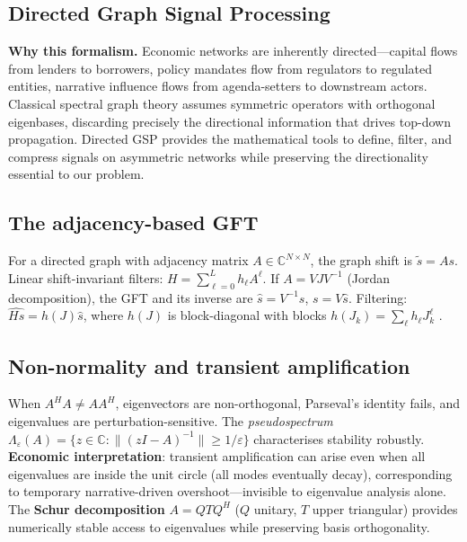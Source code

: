 \documentclass[11pt,a4paper]{article}
\theoremstyle{definition}
\newcommand{\C}{\mathbb{C}}
\begin{document}
\newpage
\begin{appendices}
\renewcommand{\thesection}{\Alph{section}}
\titleformat{\section}{\Large\bfseries\color{accent}}{Appendix~\thesection}{1em}{}

\section{Directed Graph Signal Processing}
\label{app:directed_gsp}

\textbf{Why this formalism.} Economic networks are inherently directed---capital flows from lenders to borrowers, policy mandates flow from regulators to regulated entities, narrative influence flows from agenda-setters to downstream actors. Classical spectral graph theory assumes symmetric operators with orthogonal eigenbases, discarding precisely the directional information that drives top-down propagation. Directed GSP provides the mathematical tools to define, filter, and compress signals on asymmetric networks while preserving the directionality essential to our problem.

\subsection{The adjacency-based GFT}

For a directed graph with adjacency matrix $A \in \C^{N \times N}$, the graph shift is $\tilde{s} = As$. Linear shift-invariant filters: $H = \sum_{\ell=0}^L h_\ell A^\ell$. If $A = VJV^{-1}$ (Jordan decomposition), the GFT and its inverse are $\hat{s} = V^{-1}s$, $s = V\hat{s}$. Filtering: $\widehat{Hs} = h(J)\hat{s}$, where $h(J)$ is block-diagonal with blocks $h(J_k) = \sum_\ell h_\ell J_k^\ell$ \citep{sandryhaila2014discrete}.

\subsection{Non-normality and transient amplification}

When $A^H A \neq AA^H$, eigenvectors are non-orthogonal, Parseval's identity fails, and eigenvalues are perturbation-sensitive. The \emph{pseudospectrum} $\Lambda_\varepsilon(A) = \{z \in \C : \|(zI-A)^{-1}\| \geq 1/\varepsilon\}$ characterises stability robustly. \textbf{Economic interpretation}: transient amplification can arise even when all eigenvalues are inside the unit circle (all modes eventually decay), corresponding to temporary narrative-driven overshoot---invisible to eigenvalue analysis alone. The \textbf{Schur decomposition} $A = QTQ^H$ ($Q$ unitary, $T$ upper triangular) provides numerically stable access to eigenvalues while preserving basis orthogonality.


\end{appendices}
\end{document}
